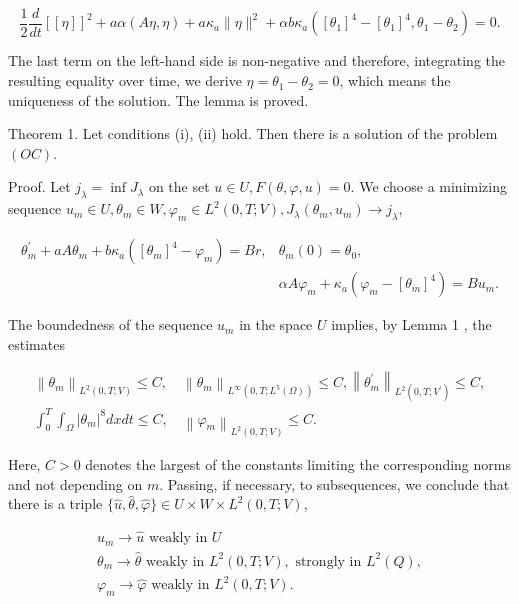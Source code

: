 \documentclass[10pt]{article}
\begin{document}
$$
\frac{1}{2} \frac{d}{d t}[[\eta]]^{2}+a \alpha(A \eta, \eta)+a \kappa_{a}\|\eta\|^{2}+\alpha b \kappa_{a}\left(\left[\theta_{1}\right]^{4}-\left[\theta_{1}\right]^{4}, \theta_{1}-\theta_{2}\right)=0 .
$$

The last term on the left-hand side is non-negative and therefore, integrating the resulting equality over time, we derive $\eta=\theta_{1}-\theta_{2}=0$, which means the uniqueness of the solution. The lemma is proved.

Theorem 1. Let conditions (i), (ii) hold. Then there is a solution of the problem $(O C)$.

Proof. Let $j_{\lambda}=\inf J_{\lambda}$ on the set $u \in U, F(\theta, \varphi, u)=0$. We choose a minimizing sequence $u_{m} \in U, \theta_{m} \in W, \varphi_{m} \in L^{2}(0, T ; V), J_{\lambda}\left(\theta_{m}, u_{m}\right) \rightarrow j_{\lambda}$,

$$
\begin{aligned}
\theta_{m}^{\prime}+a A \theta_{m}+b \kappa_{a}\left(\left[\theta_{m}\right]^{4}-\varphi_{m}\right)=B r, & \theta_{m}(0)=\theta_{0}, \\
& \alpha A \varphi_{m}+\kappa_{a}\left(\varphi_{m}-\left[\theta_{m}\right]^{4}\right)=B u_{m} .
\end{aligned}
$$

The boundedness of the sequence $u_{m}$ in the space $U$ implies, by Lemma 1 , the estimates

$$
\begin{gathered}
\left\|\theta_{m}\right\|_{L^{2}(0, T ; V)} \leq C, \quad\left\|\theta_{m}\right\|_{L^{\infty}\left(0, T ; L^{5}(\Omega)\right)} \leq C,\left\|\theta_{m}^{\prime}\right\|_{L^{2}\left(0, T ; V^{\prime}\right)} \leq C, \\
\int_{0}^{T} \int_{\Omega}\left|\theta_{m}\right|^{8} d x d t \leq C, \quad\left\|\varphi_{m}\right\|_{L^{2}(0, T ; V)} \leq C .
\end{gathered}
$$

Here, $C>0$ denotes the largest of the constants limiting the corresponding norms and not depending on $m$. Passing, if necessary, to subsequences, we conclude that there is a triple $\{\widehat{u}, \widehat{\theta}, \widehat{\varphi}\} \in U \times W \times L^{2}(0, T ; V)$,

$$
\begin{gathered}
u_{m} \rightarrow \widehat{u} \text { weakly in } U \\
\theta_{m} \rightarrow \widehat{\theta} \text { weakly in } L^{2}(0, T ; V), \text { strongly in } L^{2}(Q), \\
\varphi_{m} \rightarrow \widehat{\varphi} \text { weakly in } L^{2}(0, T ; V) .
\end{gathered}
$$
\end{document}
